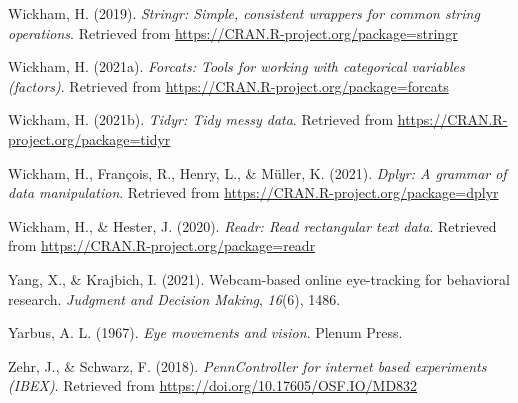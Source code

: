 \documentclass[
  man,floatsintext]{apa6}
\newlength{\cslhangindent}
\newlength{\cslentryspacingunit} %
\newenvironment{CSLReferences}[2] %
 {%
  \setlength{\parindent}{0pt}
  \ifodd #1
  \let\oldpar\par
  \def\par{\hangindent=\cslhangindent\oldpar}
  \fi
  \setlength{\parskip}{#2\cslentryspacingunit}
 }%
 {}
\begin{document}
\begin{CSLReferences}{1}{0}
\leavevmode{}%
Wickham, H. (2019). \emph{Stringr: Simple, consistent wrappers for common string operations}. Retrieved from \url{https://CRAN.R-project.org/package=stringr}

\leavevmode{}%
Wickham, H. (2021a). \emph{Forcats: Tools for working with categorical variables (factors)}. Retrieved from \url{https://CRAN.R-project.org/package=forcats}

\leavevmode{}%
Wickham, H. (2021b). \emph{Tidyr: Tidy messy data}. Retrieved from \url{https://CRAN.R-project.org/package=tidyr}

\leavevmode{}%
Wickham, H., François, R., Henry, L., \& Müller, K. (2021). \emph{Dplyr: A grammar of data manipulation}. Retrieved from \url{https://CRAN.R-project.org/package=dplyr}

\leavevmode{}%
Wickham, H., \& Hester, J. (2020). \emph{Readr: Read rectangular text data}. Retrieved from \url{https://CRAN.R-project.org/package=readr}

\leavevmode{}%
Yang, X., \& Krajbich, I. (2021). Webcam-based online eye-tracking for behavioral research. \emph{Judgment and Decision Making}, \emph{16}(6), 1486.

\leavevmode{}%
Yarbus, A. L. (1967). \emph{Eye movements and vision}. Plenum Press.

\leavevmode{}%
Zehr, J., \& Schwarz, F. (2018). \emph{PennController for internet based experiments (IBEX)}. Retrieved from \url{https://doi.org/10.17605/OSF.IO/MD832}

\end{CSLReferences}

\endgroup
\end{document}

